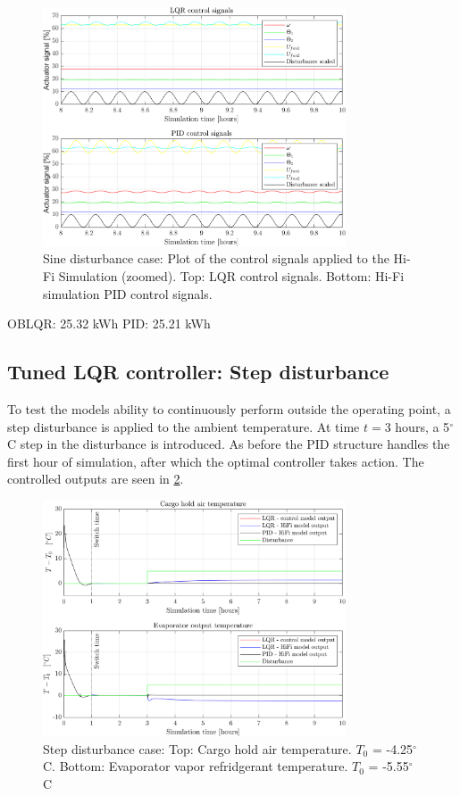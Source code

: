 \begin{figure}[H]
	\centering
	\includegraphics[width=0.8\textwidth]{Graphics/fig_inputs_sineDist_zoom.png}
	\caption{Sine disturbance case: Plot of the control signals applied to the Hi-Fi Simulation (zoomed). Top: LQR control signals. Bottom: Hi-Fi simulation PID control signals.}
	\label{fig:inputs_sineDist_zoom}
\end{figure}


OBLQR: 25.32 kWh
PID: 25.21 kWh

\newpage
\subsection{Tuned LQR controller: Step disturbance}
To test the models ability to continuously perform outside the operating point, a step disturbance is applied to the ambient temperature.  At time $t=3$ hours, a 5$^{\circ}$C step in the disturbance is introduced. As before the PID structure handles the first hour of simulation, after which the optimal controller takes action. The controlled outputs are seen in \cref{fig:LQR_wellTuned_5stepDist}.

\begin{figure}[H]
	\centering
	\includegraphics[width=0.8\textwidth]{Graphics/fig_LQRvsKresten_stepDist.png}
	\caption{Step disturbance case: Top: Cargo hold air temperature. $T_0$ = -4.25$^{\circ}$C. Bottom: Evaporator vapor refridgerant temperature. $T_0$ = -5.55$^{\circ}$C}
	\label{fig:LQR_wellTuned_5stepDist}
\end{figure}

